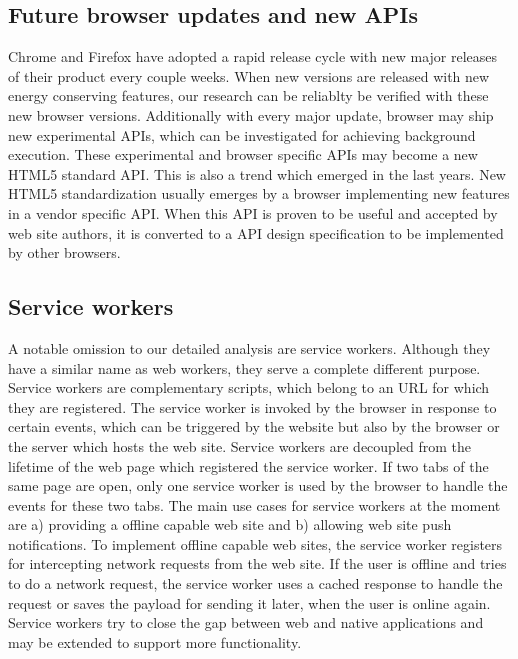 \documentclass[
	ruledheaders=section,%
	class=report,%
	thesis={type=bachelor},%
	accentcolor=9c,%
	custommargins=true,%
	marginpar=false,%
	parskip=half-,%
	fontsize=11pt,%
]{tudapub}
\begin{document}
  \subsection{Future browser updates and new APIs}

  Chrome and Firefox have adopted a rapid release cycle with new major releases of their product every couple weeks. When new versions are released with new energy conserving features, our research can be reliablty be verified with these new browser versions. Additionally with every major update, browser may ship new experimental APIs, which can be investigated for achieving background execution. These experimental and browser specific APIs may become a new HTML5 standard API. This is also a trend which emerged in the last years. New HTML5 standardization usually emerges by a browser implementing new features in a vendor specific API. When this API is proven to be useful and accepted by web site authors, it is converted to a API design specification to be implemented by other browsers.
  
  \subsection{Service workers}

  A notable omission to our detailed analysis are service workers. Although they have a similar name as web workers, they serve a complete different purpose. Service workers are complementary scripts, which belong to an URL for which they are registered. The service worker is invoked by the browser in response to certain events, which can be triggered by the website but also by the browser or the server which hosts the web site. Service workers are decoupled from the lifetime of the web page which registered the service worker. If two tabs of the same page are open, only one service worker is used by the browser to handle the events for these two tabs. The main use cases for service workers at the moment are a) providing a offline capable web site and b) allowing web site push notifications. To implement offline capable web sites, the service worker registers for intercepting network requests from the web site. If the user is offline and tries to do a network request, the service worker uses a cached response to handle the request or saves the payload for sending it later, when the user is online again. Service workers try to close the gap between web and native applications and may be extended to support more functionality.
\end{document}
